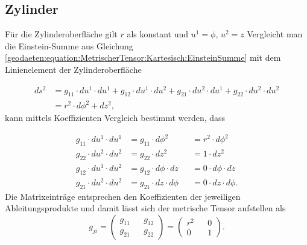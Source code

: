%
%
%
%
\subsection{Zylinder\label{geodaeten:section:MetrischerTensor:Zylinder}}

Für die Zylinderoberfläche gilt $r$ als konstant und $u^1 = \phi$, $u^2 =z$ 
Vergleicht man die Einstein-Summe aus Gleichung \eqref{geodaeten:equation:MetrischerTensor:Kartesisch:EinsteinSumme} mit dem Linienelement der Zylinderoberfläche

\begin{equation}
	\begin{aligned}
	ds^2 &= g_{11} \cdot du^1 \cdot du^1 + g_{12} \cdot du^1 \cdot du^2 + g_{21} \cdot du^2 \cdot du^1 + g_{22} \cdot du^2 \cdot du^2 \\
	&= r^2 \cdot d \phi^2 +dz^2 ,
	\end{aligned}
\end{equation}
kann mittels Koeffizienten Vergleich bestimmt werden, dass 

\begin{equation}
	\begin{alignedat}{3}
		g_{11} \cdot du^1 \cdot du^1 &= g_{11} \cdot d \phi^2 & &= r^2 \cdot d \phi^2 \\
		g_{22} \cdot du^2 \cdot du^2 &= g_{22} \cdot dz^2    & &= 1 \cdot dz^2 \\
		g_{12} \cdot du^1 \cdot du^2 &= g_{12} \cdot d \phi \cdot dz & &= 0 \cdot d \phi \cdot dz \\
		g_{21} \cdot du^2 \cdot du^2 &= g_{21} \cdot dz \cdot d \phi & &= 0 \cdot dz \cdot d \phi .
	\end{alignedat}
\end{equation}
Die Matrixeinträge entsprechen den Koeffizienten der jeweiligen Ableitungsprodukte und damit lässt sich der metrische Tensor aufstellen als
\begin{equation}
	g_{ji} =\begin{pmatrix} g_{11} && g_{12} \\ g_{21} && g_{22} \end{pmatrix}= \begin{pmatrix} r^2 && 0 \\ 0 && 1 \end{pmatrix} .
\end{equation}

